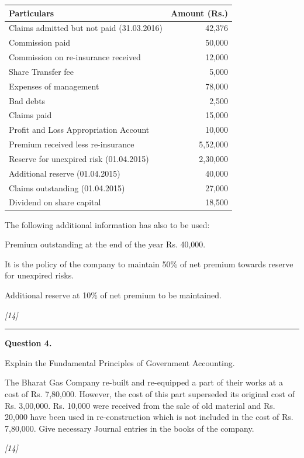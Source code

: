 \documentclass[11pt,a4paper]{article}
\newcommand{\pts}[1]{\hfill   \textit{[#1]}}
\begin{document}
\begin{center}
\small

\begin{tabular}{|l|r|}
\hline
   \textbf{Particulars} &   \textbf{Amount (Rs.)} \\
\hline
Claims admitted but not paid (31.03.2016) & 42,376 \\
Commission paid & 50,000 \\
Commission on re-insurance received & 12,000 \\
Share Transfer fee & 5,000 \\
Expenses of management & 78,000 \\
Bad debts & 2,500 \\
Claims paid & 15,000 \\
Profit and Loss Appropriation Account & 10,000 \\
Premium received less re-insurance & 5,52,000 \\
Reserve for unexpired risk (01.04.2015) & 2,30,000 \\
Additional reserve (01.04.2015) & 40,000 \\
Claims outstanding (01.04.2015) & 27,000 \\
Dividend on share capital & 18,500 \\
\hline
\end{tabular}
\end{center}

The following additional information has also to be used:

\begin{parts}
  \item Premium outstanding at the end of the year Rs. 40,000.
  \item It is the policy of the company to maintain 50\% of net premium towards reserve for unexpired risks.
  \item Additional reserve at 10\% of net premium to be maintained.
\end{parts}\pts{14}

\medskip\rule{\linewidth}{0.2pt}




\noindent   \textbf{Question 4.}

\begin{parts}
  \item Explain the Fundamental Principles of Government Accounting.
  \item The Bharat Gas Company re-built and re-equipped a part of their works at a cost of Rs. 7,80,000. However, the cost of this part superseded its original cost of Rs. 3,00,000. Rs. 10,000 were received from the sale of old material and Rs. 20,000 have been used in re-construction which is not included in the cost of Rs. 7,80,000. Give necessary Journal entries in the books of the company.
\end{parts}\pts{14}
\end{document}
